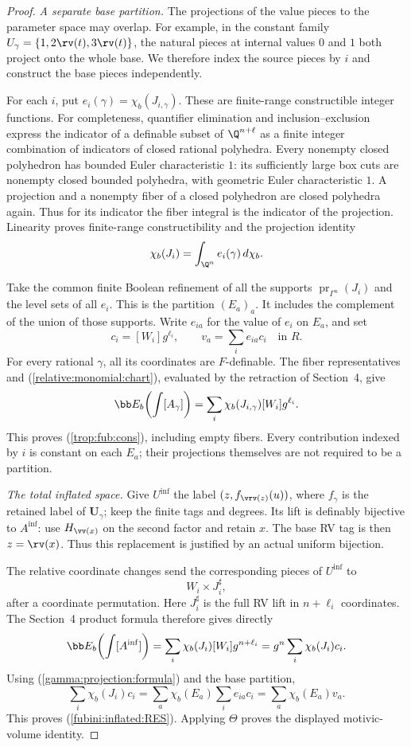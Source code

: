 \begin{proof}
\emph{A separate base partition.}
The projections of the value pieces to the parameter space
may overlap. For example, in the constant family
$U_\gamma=\{1,2\rv(t),3\rv(t)\}$, the natural pieces at
internal values $0$ and $1$ both project onto the whole base.
We therefore index the source pieces by $i$ and construct
the base pieces independently.

For each $i$, put $e_i(\gamma)=\chi_b(J_{i,\gamma})$.
These are finite-range constructible integer functions.
For completeness, quantifier elimination and
inclusion--exclusion express the indicator of a definable
subset of $\Q^{n+\ell}$ as a finite integer combination of
indicators of closed rational polyhedra.
Every nonempty closed polyhedron has bounded Euler
characteristic $1$: its sufficiently large box cuts are
nonempty closed bounded polyhedra, with geometric Euler
characteristic $1$. A projection and a nonempty fiber of
a closed polyhedron are closed polyhedra again.
Thus for its indicator the fiber integral is the indicator
of the projection. Linearity proves finite-range
constructibility and the projection identity
\begin{equation}\label{gamma:projection:formula}
 \chi_b(J_i)=\int_{\Q^n} e_i(\gamma)\,d\chi_b.
\end{equation}

Take the common finite Boolean refinement of all the supports
$\operatorname{pr}_{\Gamma^n}(J_i)$ and the level sets of
all $e_i$. This is the partition $(E_a)_a$.
It includes the complement of the union of those supports.
Write $e_{ia}$ for the value of $e_i$ on $E_a$, and set
\[
 c_i=[W_i]g^{\ell_i},\qquad v_a=\sum_i e_{ia}c_i\quad\text{in }R.
\]
For every rational $\gamma$, all its coordinates are
$F$-definable. The fiber representatives and
(\ref{relative:monomial:chart}), evaluated by the retraction
of Section~4, give
\[
 \bb E_b\!\left(\int[A_\gamma]\right)
       =\sum_i\chi_b(J_{i,\gamma})[W_i]g^{\ell_i}.
\]
This proves (\ref{trop:fub:cons}), including empty fibers.
Every contribution indexed by $i$ is constant on each $E_a$;
their projections themselves are not required to be a partition.

\emph{The total inflated space.}
Give $U^{\mathrm{inf}}$ the label
$(z,f_{\vrv(z)}(u))$, where $f_\gamma$ is the retained
label of $\bm U_\gamma$; keep the finite tags and degrees.
Its lift is definably bijective to $A^{\mathrm{inf}}$:
use $H_{\vv(x)}$ on the second factor and retain $x$.
The base RV tag is then $z=\rv(x)$. Thus this replacement
is justified by an actual uniform bijection.

The relative coordinate changes send the corresponding pieces
of $U^{\mathrm{inf}}$ to
\[
 W_i\times J_i^\sharp,
\]
after a coordinate permutation. Here $J_i^\sharp$ is the
full RV lift in $n+\ell_i$ coordinates.
The Section~4 product formula therefore gives directly
\[
 \bb E_b\!\left(\int[A^{\mathrm{inf}}]\right)
   =\sum_i\chi_b(J_i)[W_i]g^{n+\ell_i}
   =g^n\sum_i\chi_b(J_i)c_i.
\]
Using (\ref{gamma:projection:formula}) and the base partition,
\[
 \sum_i\chi_b(J_i)c_i
     =\sum_a\chi_b(E_a)\sum_i e_{ia}c_i
     =\sum_a\chi_b(E_a)v_a.
\]
This proves (\ref{fubini:inflated:RES}). Applying $\Theta$
proves the displayed motivic-volume identity.
\end{proof}

